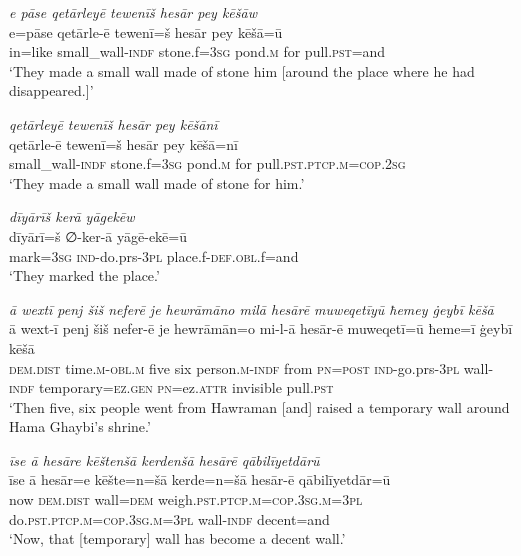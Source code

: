 \ea \label{BP.198}
\textit{e pāse qetārleyē tewenīš hesār pey kēšāw} \\ 
\gll e=pāse qetārle-ē tewenī=š hesār pey kēšā=ū \\ 
 in=like small\_wall\textsc{-indf} stone.f\textsc{=3sg} pond\textsc{.m} for pull\textsc{.pst}=and \\ 
\glt `They made a small wall made of stone him [around the place where he had disappeared.]'
\z 
 
\ea \label{BP.199}
\textit{qetārleyē tewenīš hesār pey kēšānī} \\ 
\gll qetārle-ē tewenī=š hesār pey kēšā=nī \\ 
 small\_wall\textsc{-indf} stone.f\textsc{=3sg} pond\textsc{.m} for pull\textsc{.pst}\textsc{.ptcp}\textsc{.m}\textsc{=cop}\textsc{.\textsc{2sg}} \\ 
\glt `They made a small wall made of stone for him.'
\z 
 
\ea \label{BP.200}
\textit{dīyārīš kerā yāgekēw} \\ 
\gll dīyārī=š ∅-ker-ā yāgē-ekē=ū \\ 
 mark\textsc{=3sg} \textsc{ind-}do.prs\textsc{-3pl} place.f\textsc{-def}\textsc{.obl}.f=and \\ 
\glt `They marked the place.'
\z 
 
\ea \label{BP.203}
\textit{ā wextī penj šiš neferē je hewrāmāno milā hesārē muweqetīyū ħemey ġeybī kēšā} \\ 
\gll ā wext-ī penj šiš nefer-ē je hewrāmān=o mi-l-ā hesār-ē muweqetī=ū ħeme=ī ġeybī kēšā \\ 
 \textsc{dem.dist} time\textsc{.m}\textsc{-obl}\textsc{.m} five six person\textsc{.m}\textsc{-indf} from \textsc{pn}\textsc{=\textsc{post}} \textsc{ind-}go.prs\textsc{-3pl} wall\textsc{-indf} temporary\textsc{=ez.gen} \textsc{pn}=ez.\textsc{attr} invisible pull\textsc{.pst} \\ 
\glt `Then five, six people went from Hawraman [and] raised a temporary wall around Hama Ghaybi’s shrine.'
\z 
 
\ea \label{BP.204}
\textit{īse ā hesāre kēštenšā kerdenšā hesārē qābilīyetdārū} \\ 
\gll īse ā hesār=e kēšte=n=šā kerde=n=šā hesār-ē qābilīyetdār=ū \\ 
 now \textsc{dem.dist} wall\textsc{=dem} weigh\textsc{.pst}\textsc{.ptcp}\textsc{.m}\textsc{=cop}\textsc{.3sg}\textsc{.m}\textsc{=3pl} do\textsc{.pst}\textsc{.ptcp}\textsc{.m}\textsc{=cop}\textsc{.3sg}\textsc{.m}\textsc{=3pl} wall\textsc{-indf} decent=and \\ 
\glt `Now, that [temporary] wall has become a decent wall.'
\z 
 
